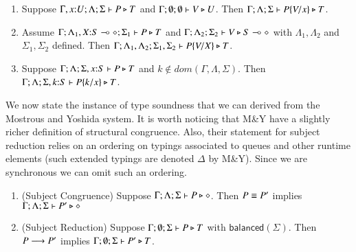\begin{lemma}
\begin{enumerate}[1.]
\item Suppose $\Gamma, x{:}U ; \Lambda ; \Sigma  \vdash P \triangleright T$ and $\Gamma; \emptyset ; \emptyset  \vdash V \triangleright U$.
		Then $\Gamma ; \Lambda ; \Sigma  \vdash P\{V/x \} \triangleright T$. 
\item Assume $\Gamma ; \Lambda_1, X{:}S \multimap \diamond ; \Sigma_1  \vdash P \triangleright T$ 
		and $\Gamma ; \Lambda_2  ; \Sigma_2  \vdash V \triangleright S \multimap \diamond$ with $ \Lambda_1, \Lambda_2$ and $\Sigma_1, \Sigma_2$ defined.  
		Then $\Gamma ; \Lambda_1, \Lambda_2 ; \Sigma_1, \Sigma_2  \vdash P\{V/X \} \triangleright T$.
\item Suppose $\Gamma ; \Lambda ; \Sigma, x{:}S  \vdash P \triangleright T$ and $k \not\in dom(\Gamma, \Lambda, \Sigma)$. 
		Then $\Gamma ; \Lambda ; \Sigma, k{:}S  \vdash P\{k/x \} \triangleright T$.
\end{enumerate}
\end{lemma}

We now state the instance of type soundness that we can derived from the Mostrous and Yoshida system. It is worth noticing that M\&Y have a slightly richer definition of structural congruence. Also, their statement for subject reduction relies on an ordering on typings associated to queues and other runtime elements (such extended typings are denoted $\Delta$ by M\&Y). Since we are synchronous we can omit such an ordering. 

\begin{theorem}
\begin{enumerate}[1.]
\item (Subject Congruence) Suppose $\Gamma; \Lambda ; \Sigma  \vdash P \triangleright \diamond$. Then $ P \equiv P'$ implies $\Gamma; \Lambda ; \Sigma  \vdash P' \triangleright \diamond$
\item (Subject Reduction) Suppose $\Gamma; \emptyset ; \Sigma  \vdash P \triangleright T$ with $\mathsf{balanced}(\Sigma)$. 
		Then $P \longrightarrow P'$ implies $\Gamma; \emptyset ; \Sigma  \vdash P' \triangleright T$.
\end{enumerate}
\end{theorem}

	